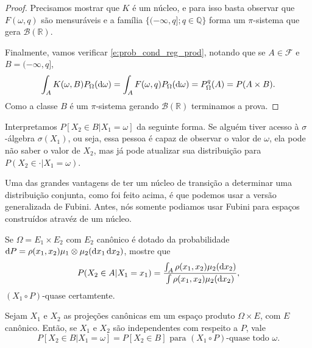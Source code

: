 \documentclass[../Notas_de_aula.tex]{subfiles}
\begin{document}
\begin{proof}
  Precisamos mostrar que $K$ é um núcleo, e para isso basta observar que $F(\omega, q)$ são mensuráveis e a família $\{(-\infty, q]; q \in \mathbb{Q}\}$ forma um $\pi$-sistema que gera $\mathcal{B}(\mathbb{R})$.

  Finalmente, vamos verificar \eqref{e:prob_cond_reg_prod}, notando que se $A \in \mathcal{F}$ e $B = (-\infty, q]$,
  \begin{equation}
    \int_A K(\omega, B) P_\Omega(\mathop{}\!\mathrm{d} \omega) = \int_A F(\omega, q) P_\Omega (\mathop{}\!\mathrm{d} \omega) = P^q_\Omega(A) = P(A \times B).
  \end{equation}
  Como a classe $B$ é um $\pi$-sistema gerando $\mathcal{B}(\mathbb{R})$ terminamos a prova.
\end{proof}

Interpretamos $P[X_2 \in B | X_1 = \omega]$ da seguinte forma.
Se alguém tiver acesso à $\sigma$-álgebra $\sigma(X_1)$, ou seja, essa pessoa é capaz de observar o valor de $\omega$, ela pode não saber o valor de $X_2$, mas já pode atualizar sua distribuição para $P(X_2 \in \cdot| X_1 = \omega)$.

Uma das grandes vantagens de ter um núcleo de transição a determinar uma distribuição conjunta, como foi feito acima, é que podemos usar a versão generalizada de Fubini.
Antes, nós somente podiamos usar Fubini para espaços construídos atravéz de um núcleo.

\begin{exercise}
  Se $\Omega = E_1 \times E_2$ com $E_2$ canônico é dotado da probabilidade $\mathop{}\!\mathrm{d} P = \rho(x_1, x_2) \mu_1 \otimes \mu_2 (\mathop{}\!\mathrm{d} x_1 \mathop{}\!\mathrm{d} x_2)$, mostre que
  \begin{equation}
    P(X_2 \in A|X_1 = x_1) = \frac{\int_A \rho(x_1, x_2) \mu_2(\mathop{}\!\mathrm{d} x_2)}{\int \rho(x_1, x_2) \mu_2(\mathop{}\!\mathrm{d} x_2)},
  \end{equation}
  $(X_1 \circ P)$-quase certamtente.
\end{exercise}

\begin{exercise}
  \label{x:prob_cond_reg_indep}
  Sejam $X_1$ e $X_2$ as projeções canônicas em um espaço produto $\Omega \times E$, com $E$ canônico.
  Então, se $X_1$ e $X_2$ são independentes com respeito a $P$, vale
  \begin{equation}
    P[X_2 \in B | X_1 = \omega] = P[X_2 \in B] \text{ para $(X_1 \circ P)$-quase todo $\omega$}.
  \end{equation}
\end{exercise}
\end{document}
